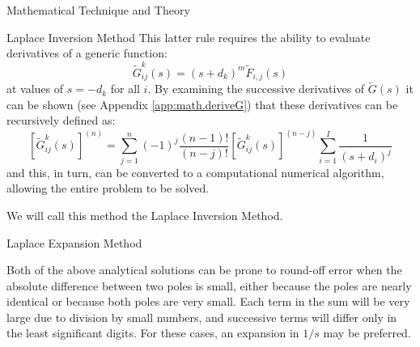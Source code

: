 \begin{chapter}{Mathematical Technique and Theory\label{chap:math}}
\begin{section}{Laplace Inversion Method}
    This latter rule requires the ability to evaluate derivatives of a
    generic function:
    \begin{equation}
      \tilde{G}_{ij}^k(s) = (s+d_k)^m \tilde{F}_{i,j}(s)
    \end{equation}
    at values of $s = -d_k$ for all $i$.  By examining the successive
    derivatives of $\tilde{G}(s)$ it can be shown (see Appendix
    \ref{app:math.deriveG}) that these derivatives can be recursively
    defined as:
    \begin{equation}
      \left[\tilde{G}_{ij}^k(s)\right]^{(n)} = \sum_{j=1}^n(-1)^j
      \frac{(n-1)!}{(n-j)!}\left[\tilde{G}_{ij}^k(s)\right]^{(n-j)}
      \sum_{i=1}^I \frac{1}{(s+d_i)^j}
    \end{equation}
    and this, in turn, can be converted to a computational numerical
    algorithm, allowing the entire problem to be solved.
  
    We will call this method the Laplace Inversion Method.

  \end{section}  
  
  \begin{section}{Laplace Expansion Method}\label{sec:math.expansion}
    
    Both of the above analytical solutions can be prone to round-off
    error when the absolute difference between two poles is small,
    either because the poles are nearly identical or because both
    poles are very small.  Each term in the sum will be very large due
    to division by small numbers, and successive terms will differ
    only in the least significant digits.  For these cases, an
    expansion in $1/s$ may be preferred.
    

\end{section}
\end{chapter}
